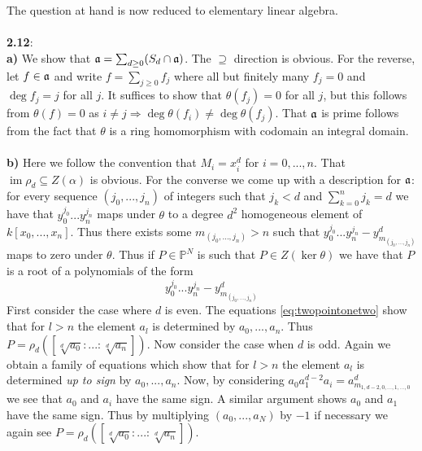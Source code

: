 \documentclass[12pt]{article}
\numberwithin{thm}{subsection}
\numberwithin{defn}{subsection}
\numberwithin{lemma}{subsection}
\numberwithin{example}{subsection}
\numberwithin{notation}{subsection}
\numberwithin{cor}{subsection}
\numberwithin{remark}{subsection}
\numberwithin{condition}{subsection}
\numberwithin{question}{subsection}
\numberwithin{construction}{subsection}
\numberwithin{construction}{subsection}
\numberwithin{construction}{subsection}
\newcommand{\bb}[1]{\mathbb{#1}}
\newcommand{\im}{\operatorname{im}}
\begin{document}
The question at hand is now reduced to elementary linear algebra.\\\\
%
\textbf{2.12}:\\
\textbf{a)} We show that $\frak{a} = \sum_{d \geq 0}(S_d \cap \frak{a})$. The $\supseteq$ direction is obvious. For the reverse, let $f \in \frak{a}$ and write $f = \sum_{j \geq 0}f_j$ where all but finitely many $f_j = 0$ and $\operatorname{deg}f_j = j$ for all $j$. It suffices to show that $\theta(f_j) = 0$ for all $j$, but this follows from $\theta(f) = 0$ as $i \neq j \Rightarrow \operatorname{deg}\theta(f_i) \neq \operatorname{deg}\theta(f_j)$. That $\frak{a}$ is prime follows from the fact that $\theta$ is a ring homomorphism with codomain an integral domain.\\\\
%
\textbf{b)} Here we follow the convention that $M_i = x_i^d$ for $i = 0,...,n$. That $\im \rho_d \subseteq Z(\alpha)$ is obvious. For the converse we come up with a description for $\frak{a}$: for every sequence $(j_0,...,j_n)$ of integers such that $j_k < d$ and $\sum_{k = 0}^n j_k = d$ we have that $y_0^{j_0}...y_n^{j_n}$ maps under $\theta$ to a degree $d^2$ homogeneous element of $k[x_0,...,x_n]$. Thus there exists some $m_{(j_0,...,j_n)} > n$ such that $y_0^{j_0}...y_n^{j_n} - y_{m_{(j_0,...,j_n)}}^d$ maps to zero under $\theta$. Thus if $P \in \bb{P}^N$ is such that $P \in Z(\ker \theta)$ we have that $P$ is a root of a polynomials of the form
\begin{equation}\label{eq:twopointonetwo}
    y_0^{j_0}...y_n^{j_n} - y_{m_{(j_0,...,j_n)}}^d
\end{equation}
First consider the case where $d$ is even. The equations \eqref{eq:twopointonetwo} show that for $l > n$ the element $a_l$ is determined by $a_0,...,a_n$. Thus $P = \rho_d([\sqrt[d]{a_0}:...:\sqrt[d]{a_n}])$. Now consider the case when $d$ is odd. Again we obtain a family of equations which show that for $l > n$ the element $a_l$ is determined \emph{up to sign} by $a_0,...,a_n$. Now, by considering $a_0a_1^{d-2}a_i = a_{m_{1,d-2,0,...,1,...,0}}^d$ we see that $a_0$ and $a_i$ have the same sign. A similar argument shows $a_0$ and $a_1$ have the same sign. Thus by multiplying $(a_0,...,a_N)$ by $-1$ if necessary we again see $P = \rho_d([\sqrt[d]{a_0}:...:\sqrt[d]{a_n}])$.
\end{document}
